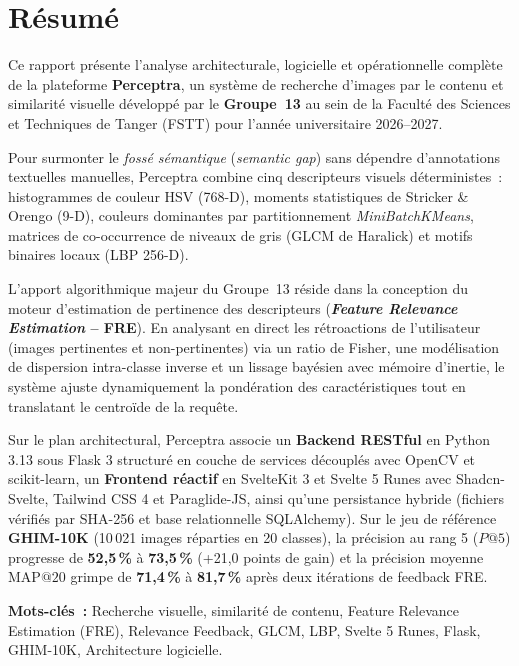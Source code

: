 \chapter*{Résumé}

Ce rapport présente l'analyse architecturale, logicielle et opérationnelle complète de la plateforme \textbf{Perceptra}, un système de recherche d'images par le contenu et similarité visuelle développé par le \textbf{Groupe~13} au sein de la Faculté des Sciences et Techniques de Tanger (FSTT) pour l'année universitaire 2026--2027.

Pour surmonter le \textit{fossé sémantique} (\textit{semantic gap}) sans dépendre d'annotations textuelles manuelles, Perceptra combine cinq descripteurs visuels déterministes~: histogrammes de couleur HSV (768-D), moments statistiques de Stricker \& Orengo (9-D), couleurs dominantes par partitionnement \textit{MiniBatchKMeans}, matrices de co-occurrence de niveaux de gris (GLCM de Haralick) et motifs binaires locaux (LBP 256-D).

L'apport algorithmique majeur du Groupe~13 réside dans la conception du moteur d'estimation de pertinence des descripteurs (\textbf{\textit{Feature Relevance Estimation} -- FRE}). En analysant en direct les rétroactions de l'utilisateur (images pertinentes et non-pertinentes) via un ratio de Fisher, une modélisation de dispersion intra-classe inverse et un lissage bayésien avec mémoire d'inertie, le système ajuste dynamiquement la pondération des caractéristiques tout en translatant le centroïde de la requête.

Sur le plan architectural, Perceptra associe un \textbf{Backend RESTful} en Python 3.13 sous Flask 3 structuré en couche de services découplés avec OpenCV et scikit-learn, un \textbf{Frontend réactif} en SvelteKit 3 et Svelte 5 Runes avec Shadcn-Svelte, Tailwind CSS 4 et Paraglide-JS, ainsi qu'une persistance hybride (fichiers vérifiés par SHA-256 et base relationnelle SQLAlchemy). Sur le jeu de référence \textbf{GHIM-10K} (10\,021 images réparties en 20 classes), la précision au rang 5 ($P@5$) progresse de \textbf{52,5\,\%} à \textbf{73,5\,\%} (+21,0 points de gain) et la précision moyenne $\text{MAP}@20$ grimpe de \textbf{71,4\,\%} à \textbf{81,7\,\%} après deux itérations de feedback FRE.

\vspace{0.2cm}
\noindent\textbf{Mots-clés~:} Recherche visuelle, similarité de contenu, Feature Relevance Estimation (FRE), Relevance Feedback, GLCM, LBP, Svelte 5 Runes, Flask, GHIM-10K, Architecture logicielle.

